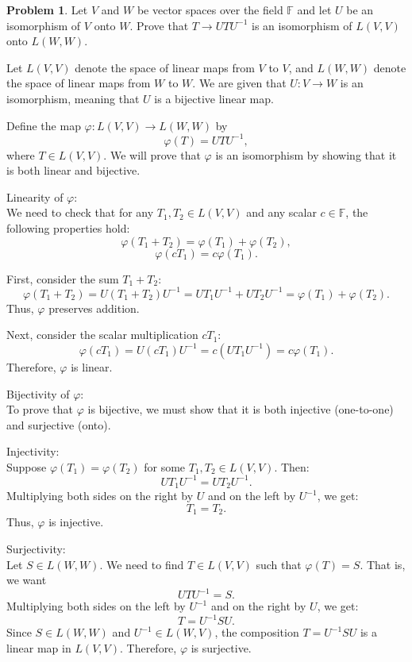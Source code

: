 \documentclass[12pt]{article}
\theoremstyle{definition}
\newtheorem{problem}{Problem}
\begin{document}
\begin{problem}
    Let $V$ and $W$ be vector spaces over the field $\mathbb{F}$ and let $U$ be an isomorphism
    of $V$ onto $W$. Prove that $T \rightarrow UTU^{-1}$ is an isomorphism of $L(V, V)$ onto $L(W, W)$.


    \begin{solution}
        Let \( L(V, V) \) denote the space of linear maps from \( V \) to \( V \), and \( L(W, W) \) denote the space of linear maps from \( W \) to \( W \). We are given that \( U: V \to W \) is an isomorphism, meaning that \( U \) is a bijective linear map.

        Define the map \( \varphi: L(V, V) \to L(W, W) \) by
        \[    \varphi(T) = UTU^{-1},    \]
        where \( T \in L(V, V) \). We will prove that \( \varphi \) is an isomorphism by showing that it is both linear and bijective.

        Linearity of \( \varphi \):\\
        We need to check that for any \( T_1, T_2 \in L(V, V) \) and any scalar \( c \in \mathbb{F} \), the following properties hold:
        \[
        \varphi(T_1 + T_2) = \varphi(T_1) + \varphi(T_2),
        \]
        \[
        \varphi(c T_1) = c \varphi(T_1).
        \]

        First, consider the sum \( T_1 + T_2 \):
        \[
        \varphi(T_1 + T_2) = U(T_1 + T_2)U^{-1} = UT_1U^{-1} + UT_2U^{-1} = \varphi(T_1) + \varphi(T_2).
        \]
        Thus, \( \varphi \) preserves addition.

        Next, consider the scalar multiplication \( c T_1 \):
        \[
        \varphi(c T_1) = U(c T_1)U^{-1} = c(UT_1U^{-1}) = c \varphi(T_1).
        \]
        Therefore, \( \varphi \) is linear.

        Bijectivity of \( \varphi \):\\
        To prove that \( \varphi \) is bijective, we must show that it is both injective (one-to-one) and surjective (onto).

        Injectivity:\\
        Suppose \( \varphi(T_1) = \varphi(T_2) \) for some \( T_1, T_2 \in L(V, V) \). Then:
        \[
        UT_1U^{-1} = UT_2U^{-1}.
        \]
        Multiplying both sides on the right by \( U \) and on the left by \( U^{-1} \), we get:
        \[
        T_1 = T_2.
        \]
        Thus, \( \varphi \) is injective.

        Surjectivity:\\
        Let \( S \in L(W, W) \). We need to find \( T \in L(V, V) \) such that \( \varphi(T) = S \). That is, we want
        \[
        UTU^{-1} = S.
        \]
        Multiplying both sides on the left by \( U^{-1} \) and on the right by \( U \), we get:
        \[
        T = U^{-1} S U.
        \]
        Since \( S \in L(W, W) \) and \( U^{-1} \in L(W, V) \), the composition \( T = U^{-1} S U \) is a linear map in \( L(V, V) \). Therefore, \( \varphi \) is surjective.
        

\end{solution}
\end{problem}
\end{document}
